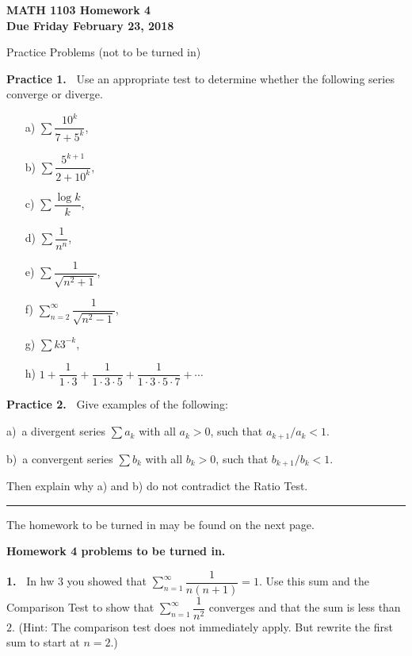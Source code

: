 \documentclass[12pt]{article}
\theoremstyle{definition}
\theoremstyle{remark}
\theoremstyle{definition}
\begin{document}
  

{\bf MATH 1103 Homework 4}\\
{\bf Due Friday February 23, 2018}

Practice Problems (not to be turned in)

{\bf Practice 1.\ } Use an appropriate test to determine whether the following series converge or diverge.
\begin{enumerate}
\item[a)] $\sum\dfrac{10^k}{7+5^k}$,
\item[b)] $\sum\dfrac{5^{k+1}}{2+10^k}$,
\item[c)] $\sum\dfrac{\log k}{k}$,
\item[d)] $ \sum\dfrac{1}{n^n}$,
\item[e)] $ \sum\dfrac{1}{\sqrt{n^2+1}}$, 
\item[f)] $ \sum_{n=2}^\infty\dfrac{1}{\sqrt{n^2-1}}$, 
\item[g)] $ \sum k 3^{-k}$,
\item[h)] $ 1+\dfrac{1}{1\cdot 3}+\dfrac{1}{1\cdot 3\cdot 5}+\dfrac{1}{1\cdot 3\cdot 5\cdot 7}+\cdots $
\end{enumerate}

{\bf Practice 2.\ }  Give examples of the following:

a)\ a divergent series $\sum a_k$ with all $a_k>0$, such that $a_{k+1}/a_k< 1$. 

b)\ a  convergent series $\sum b_k$ with all $b_k>0$, such that $b_{k+1}/b_k< 1$. 

Then explain why a) and b)  do not contradict the Ratio Test. 

 \rule{\textwidth}{1pt}
The homework to be turned in may be found on the next page.


\newpage

{\bf Homework 4 problems to be turned in.}

{\bf 1.\ } In hw 3 you showed that $\sum\limits_{n=1}^\infty\dfrac{1}{n(n+1)}=1$. 
Use this sum and the Comparison Test to show that 
$\sum\limits_{n=1}^\infty\dfrac{1}{n^2}$ converges and that the sum is less than $2$. 
(Hint: The comparison test does not immediately apply. But rewrite the first sum to start at $n=2$.)
\end{document}
